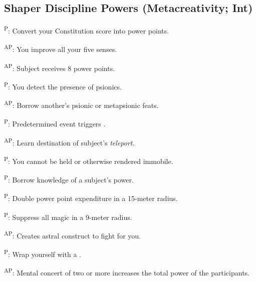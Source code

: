 \subsection{Shaper Discipline Powers {\normalsize(Metacreativity; Int)}}
\begin{enumerate*}
\item {}\textsuperscript{P}: Convert your Constitution score into power points.

      \textsuperscript{AP}: You improve all your five senses.

\item {}\textsuperscript{AP}: Subject receives 8 power points. %

      \textsuperscript{P}: You detect the presence of psionics.

      \textsuperscript{AP}: Borrow another's psionic or metapsionic feats. %


      \textsuperscript{P}: Predetermined event triggers .

\item {}\textsuperscript{AP}: Learn destination of subject's \emph{teleport}. %

\item {}\textsuperscript{P}: You cannot be held or otherwise rendered immobile.

      \textsuperscript{P}: Borrow knowledge of a subject's power.

      \textsuperscript{P}: Double power point expenditure in a 15-meter radius.

\item {}\textsuperscript{P}: Suppress all magic in a 9-meter radius.

      \textsuperscript{AP}: Creates astral construct to fight for you. %

      \textsuperscript{P}: Wrap yourself with a .

      \textsuperscript{AP}: Mental concert of two or more increases the total power of the participants. %


\end{enumerate*}
